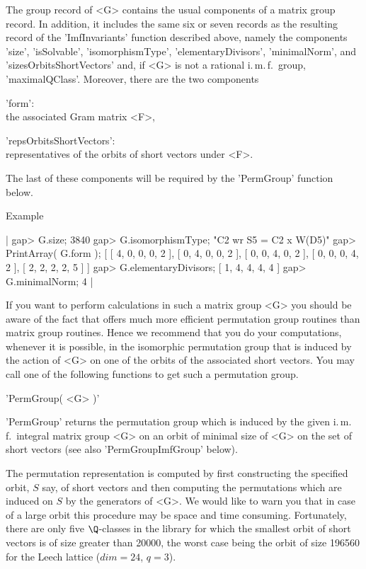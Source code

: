 The group record  of <G> contains the usual  components of a matrix group
record. In addition,  it includes  the same  six or seven  records as the
resulting record of the 'ImfInvariants'  function described above, namely
the        components        'size',   'isSolvable',   'isomorphismType',
'elementaryDivisors', 'minimalNorm', and  'sizesOrbitsShortVectors'  and,
if <G> is not a   rational i.\,m.\,f.~group, 'maximalQClass'.   Moreover,
there are the two components

'form': \\
      the associated Gram matrix <F>,

'repsOrbitsShortVectors': \\
      representatives of the orbits of short vectors under <F>.

The last of these components will be required by the 'PermGroup' function
below.

Example\:

|    gap> G.size;
    3840
    gap> G.isomorphismType;
    "C2 wr S5 = C2 x W(D5)"
    gap> PrintArray( G.form );
    [ [  4,  0,  0,  0,  2 ],
      [  0,  4,  0,  0,  2 ],
      [  0,  0,  4,  0,  2 ],
      [  0,  0,  0,  4,  2 ],
      [  2,  2,  2,  2,  5 ] ]
    gap> G.elementaryDivisors;
    [ 1, 4, 4, 4, 4 ]
    gap> G.minimalNorm;
    4 |

If you want to perform calculations in such a matrix group <G> you should
be aware of the  fact that {\GAP} offers  much more efficient permutation
group routines than matrix group routines. Hence we recommend that you do
your computations, whenever it is possible, in the isomorphic permutation
group that is induced by  the action of  <G> on one  of the orbits of the
associated short vectors. You may call one  of the following functions to
get such a permutation group.

\vspace{5mm}
'PermGroup( <G> )'%

'PermGroup' returns  the permutation group  which is induced by the given
i.\,m.\,f.~integral matrix group  <G>  on an orbit of minimal size of <G>
on the set of short vectors (see also 'PermGroupImfGroup' below).

The  permutation representation is   computed  by first  constructing the
specified  orbit, $S$ say,    of short vectors   and  then computing  the
permutations which are induced on $S$ by the generators  of <G>. We would
like to warn  you that in case  of a  large  orbit this procedure  may be
space  and time consuming. Fortunately, there  are only five $\Q$-classes
in the library  for which  the smallest orbit of short vectors is of size
greater than 20000, the worst case being the orbit of size 196560 for the
Leech lattice ($dim = 24$, $q = 3$).


